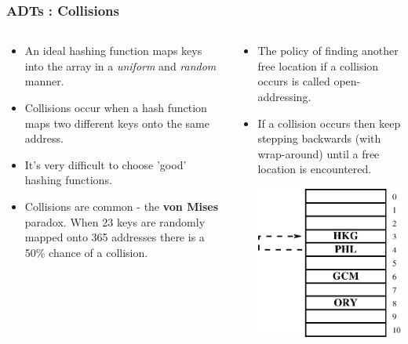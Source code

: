 
\begin{frame}[fragile]
\frametitle{ADTs : Collisions}
\begin{columns}[T]

\begin{column}{0.45\textwidth}
\begin{itemize}[<+->]
\item An ideal hashing function maps keys into the array in a {\it uniform} and {\it random} manner.
\item Collisions occur when a hash function maps two different keys onto the same address.
\item It's very difficult to choose 'good' hashing functions.
\item Collisions are common - the {\bf von Mises} paradox. When 23 keys are randomly mapped onto 365 addresses there is a 50\% chance of a collision.
\end{itemize}
\end{column}

\pause
\begin{column}{0.45\textwidth}
\begin{itemize}[<+->]
\item The policy of finding another free location if a collision occurs is called open-addressing.
\item If a collision occurs then keep stepping backwards (with wrap-around) until a free location is encountered.
\pause
\begin{center}
\includegraphics[height=0.3333\textheight]{../Images/hashprobe.pdf}
\end{center}
\end{itemize}
\end{column}

\end{columns}
\end{frame}


